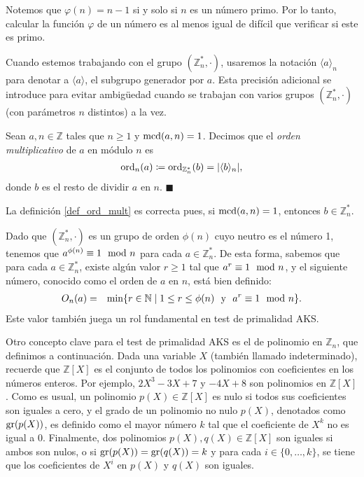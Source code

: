 Notemos que $\varphi(n) = n - 1$ si y solo si
$n$ es un número primo. Por lo tanto, calcular la función $\varphi$ de un número es al menos igual de difícil que verificar si este es primo.


Cuando estemos trabajando con el grupo $(\mathbb{Z}_n^*, \cdot)$, usaremos la notación $\langle a\rangle_n$ para denotar a $\langle a \rangle$, el subgrupo generador por $a$. Esta precisión adicional se introduce para evitar ambigüedad cuando se trabajan con varios grupos $(\mathbb{Z}_n^*, \cdot)$ (con parámetros $n$ distintos) a la vez.

\begin{definition}\label{def_ord_mult}
	 Sean $a, n\in \mathbb{Z}$ tales que $n \geq 1$ y ${\rm mcd}(a,n)=1$. Decimos que el \emph{orden multiplicativo} de $a$ en módulo $n$ es
         \begin{eqnarray*}
         \mathrm{ord}_{n}(a) \coloneqq \mathrm{ord}_{\mathbb{Z}_n^*}(b) = |\langle b \rangle _n|,
         \end{eqnarray*}
	donde $b$ es el resto de dividir $a$ en $n$. \hfill$\blacksquare$
\end{definition}

La definición \ref{def_ord_mult} es correcta pues, si ${\rm mcd}(a, n) = 1$, entonces $b \in \mathbb{Z}_n^*$.




Dado que $(\mathbb{Z}_n^*, \cdot)$ es un grupo de orden $\phi(n)$ cuyo
neutro es el número 1, tenemos que $a^{\phi(n)} \equiv 1 \mod n$ para
cada $a \in \mathbb{Z}_n^*$. De esta forma, sabemos que para cada $a
\in \mathbb{Z}_n^*$, existe algún valor $r \geq 1$ tal que $a^r \equiv
1 \mod n$, y el siguiente número, conocido como el orden de $a$ en
$n$, está bien definido:
\begin{eqnarray*}
  O_n(a) & = & \min \{ r \in \mathbb{N} \mid 1 \leq r \leq \phi(n)
  \ \text{ y } \ a^r \equiv 1 \mod n \}.
\end{eqnarray*}
Este valor también juega un rol fundamental en test de primalidad AKS.

Otro concepto clave para el test de primalidad AKS es el de
polinomio en $\mathbb{Z}_n$, que definimos a continuación. Dada una
variable $X$ (también llamado indeterminado), recuerde que
$\mathbb{Z}[X]$ es el conjunto de todos los polinomios con
coeficientes en los números enteros. Por ejemplo, $2 X^3 - 3X +7$ y
$-4 X + 8$ son polinomios en $\mathbb{Z}[X]$. Como es usual, un
polinomio $p(X) \in \mathbb{Z}[X]$ es nulo si todos sus coeficientes
son iguales a cero, y el grado de un polinomio no nulo $p(X)$,
denotados como ${\rm gr}(p(X))$, es definido como el mayor número $k$
tal que el coeficiente de $X^k$ no es igual a $0$. Finalmente, dos
polinomios $p(X), q(X) \in \mathbb{Z}[X]$ son iguales si ambos son
nulos, o si ${\rm gr}(p(X))={\rm gr}(q(X)) = k$ y para cada $i \in \{0,
\ldots, k\}$, se tiene que los coeficientes de $X^i$ en $p(X)$ y
$q(X)$ son iguales.

